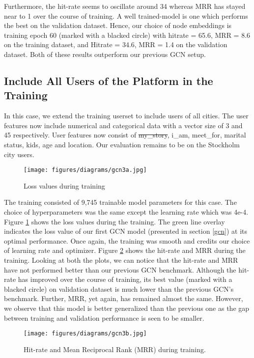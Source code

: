 \documentclass{kththesis}
\begin{document}
Furthermore, the hit-rate seems to oscillate around 34 whereas MRR has stayed near to 1 over the course of training. A well trained-model is one which performs the best on the validation dataset. Hence, our choice of node embeddings is training epoch 60 (marked with a blacked circle) with hitrate = 65.6, MRR = 8.6 on the training dataset, and Hitrate = 34.6, MRR = 1.4 on the validation dataset. Both of these results outperform our previous GCN setup. 
\subsection{Include All Users of the Platform in the Training} %
In this case, we extend the training userset to include users of all cities. The user features now include numerical and categorical data with a vector size of 3 and 45 respectively. User features now consist of \st{my\_story}, i\_am, meet\_for, marital status, kids, age and location. Our evaluation remains to be on the Stockholm city users. \\

\begin{figure}[h!]
\centering
\texttt{[image: figures/diagrams/gcn3a.jpg]}
\caption{Loss values during training}
\label{fig:gcn3a}
\end{figure}

The training consisted of 9,745 trainable model parameters for this case. The choice of hyperparameters was the same except the learning rate which was 4e-4. Figure \ref{fig:gcn3a} shows the loss values during the training. The green line overlay indicates the loss value of our first GCN model (presented in section \ref{gcn}) at its optimal performance. Once again, the training was smooth and credits our choice of learning rate and optimizer. Figure \ref{fig:gcn3b} shows the hit-rate and MRR during the training. Looking at both the plots, we can notice that the hit-rate and MRR have not performed better than our previous GCN benchmark. Although the hit-rate has improved over the course of training, its best value (marked with a blacked circle) on validation dataset is much lower than the previous GCN's benchmark. Further, MRR, yet again, has remained almost the same. However, we observe that this model is better generalized than the previous one as the gap between training and validation performance is seen to be smaller. \\

\begin{figure}[h!]
\centering
\texttt{[image: figures/diagrams/gcn3b.jpg]}
\caption{Hit-rate and Mean Reciprocal Rank (MRR) during training.}
\label{fig:gcn3b}
\end{figure}
\end{document}

